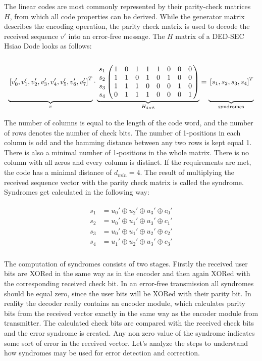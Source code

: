 The linear codes are most commonly represented by their parity-check matrices $H$, from which all code properties can be derived. While the generator matrix describes the encoding operation, the parity check matrix is used to decode the received sequence $v'$ into an error-free message. The $H$ matrix of a DED-SEC Hsiao Dode looks as follows:
\begin{equation*}
\underbrace{
\vphantom{\bordermatrix{&&&&&&&&\cr &1&0&0&0&1&1&1&0\cr&0&1&0&0&0&1&1&1\cr&0&0&1&0&1&0&1&1\cr&0&0&0&1&1&1&0&1\cr}
}\left[v_0',v_1',v_2',v_3',v_4',v_5',v_6',v_7' \right ]^T}_{v}
\cdot \underbrace{\bordermatrix{
&&&&&&&&\cr 
 s_1 &1& 0 & 1 & 1 &1&0&0&0 \cr 
 s_2 &1& 1 & 0 & 1 &0&1&0&0 \cr 
 s_3 &1& 1 & 1 & 0 &0&0&1&0\cr 
 s_4 &0& 1 & 1 & 1 &0&0&0&1
}}_{H_{4\times 8}} = 
\underbrace{
\vphantom{\bordermatrix{&&&&&&&&\cr &1&0&0&0&1&1&1&0\cr&0&1&0&0&0&1&1&1\cr&0&0&1&0&1&0&1&1\cr&0&0&0&1&1&1&0&1\cr}
}\left[s_1,s_2,s_3,s_4 \right ]^T}_{\text{syndromes}}
\end{equation*}

The number of columns is equal to the length of the code word, and the number of rows denotes the number of check bits. The number of 1-positions in each column is odd and the hamming distance between any two rows is kept equal 1. There is also a minimal number of 1-positions in the whole matrix. There is no column with all zeros and every column is distinct. If the requirements are met, the code has a minimal distance of $d_{min} = 4$. The result of multiplying the received sequence vector with the parity check matrix is called the syndrome. Syndromes get calculated in the following way:

\begin{align}
\begin{aligned}
s_1 &= u_0' \oplus u_2' \oplus u_3' \oplus c_0' \\
s_2 &= u_0' \oplus u_1' \oplus u_3' \oplus c_1' \\
s_3 &= u_0' \oplus u_1' \oplus u_2' \oplus c_2' \\
s_4 &= u_1'\oplus u_2' \oplus u_3' \oplus c_3' \\
\end{aligned}
\end{align}

The computation of syndromes consists of two stages. Firstly the received user bits are XORed in the same way as in the encoder and then again XORed with the corresponding received check bit. In an error-free transmission all syndromes should be equal zero, since the user bits will be XORed with their parity bit. In reality the decoder really contains an encoder module, which calculates parity bits from the received vector exactly in the same way as the encoder module from transmitter. The calculated check bits are compared with the received check bits and the error syndrome is created. Any non zero value of the syndrome indicates some sort of error in the received vector. Let's analyze the steps to understand how syndromes may be used for error detection and correction. 

